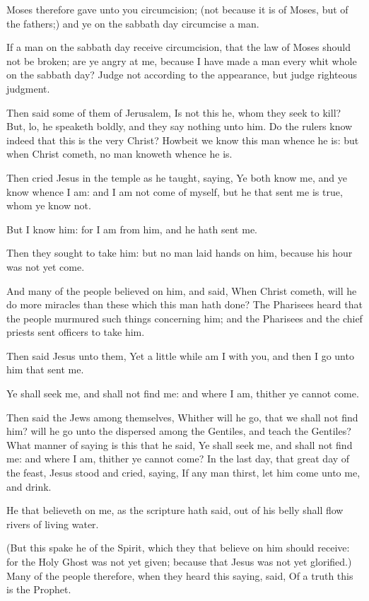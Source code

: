 \verse Moses therefore gave unto you circumcision; (not because it is of Moses, but of the fathers;) and ye on the sabbath day circumcise a man.

\verse If a man on the sabbath day receive circumcision, that the law of Moses should not be broken; are ye angry at me, because I have made a man every whit whole on the sabbath day?  \verse Judge not according to the appearance, but judge righteous judgment.

\verse Then said some of them of Jerusalem, Is not this he, whom they seek to kill?  \verse But, lo, he speaketh boldly, and they say nothing unto him. Do the rulers know indeed that this is the very Christ?  \verse Howbeit we know this man whence he is: but when Christ cometh, no man knoweth whence he is.

\verse Then cried Jesus in the temple as he taught, saying, Ye both know me, and ye know whence I am: and I am not come of myself, but he that sent me is true, whom ye know not.

\verse But I know him: for I am from him, and he hath sent me.

\verse Then they sought to take him: but no man laid hands on him, because his hour was not yet come.

\verse And many of the people believed on him, and said, When Christ cometh, will he do more miracles than these which this man hath done?  \verse The Pharisees heard that the people murmured such things concerning him; and the Pharisees and the chief priests sent officers to take him.

\verse Then said Jesus unto them, Yet a little while am I with you, and then I go unto him that sent me.

\verse Ye shall seek me, and shall not find me: and where I am, thither ye cannot come.

\verse Then said the Jews among themselves, Whither will he go, that we shall not find him? will he go unto the dispersed among the Gentiles, and teach the Gentiles?  \verse What manner of saying is this that he said, Ye shall seek me, and shall not find me: and where I am, thither ye cannot come?  \verse In the last day, that great day of the feast, Jesus stood and cried, saying, If any man thirst, let him come unto me, and drink.

\verse He that believeth on me, as the scripture hath said, out of his belly shall flow rivers of living water.

\verse (But this spake he of the Spirit, which they that believe on him should receive: for the Holy Ghost was not yet given; because that Jesus was not yet glorified.)  \verse Many of the people therefore, when they heard this saying, said, Of a truth this is the Prophet.

